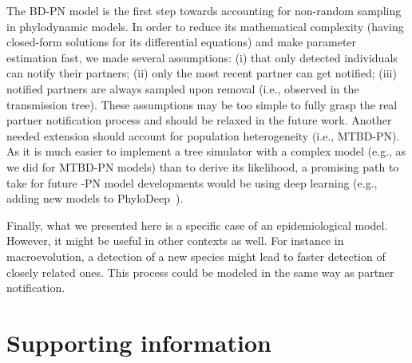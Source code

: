 \documentclass[10pt,letterpaper]{article}
\begin{document}
The BD-PN model is the first step towards accounting for non-random sampling in phylodynamic models. In order to reduce its mathematical complexity (having closed-form solutions for its differential equations) and make parameter estimation fast, we made several assumptions: (i) that only detected individuals can notify their partners; (ii) only the most recent partner can get notified; (iii) notified partners are always sampled upon removal (i.e., observed in the transmission tree). These assumptions may be too simple to fully grasp the real partner notification process and should be relaxed in the future work. Another needed extension should account for population heterogeneity (i.e., MTBD-PN). As it is much easier to implement a tree simulator with a complex model (e.g., as we did for MTBD-PN models) than to derive its likelihood, a promising path to take for future -PN model developments would be using deep learning (e.g., adding new models to PhyloDeep~\cite{Voznica2021}). 

Finally, what we presented here is a specific case of an epidemiological model. However, it might be useful in other contexts as well. For instance in macroevolution, a detection of a new species might lead to faster detection of closely related ones. This process could be modeled in the same way as partner notification. 


\section*{Supporting information}

%
%
%
%
%
%
%
\end{document}
